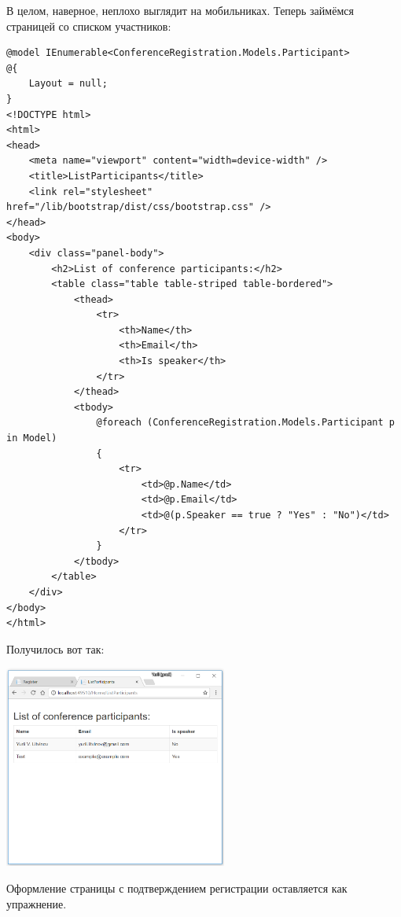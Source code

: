 \documentclass[a5paper]{article}
\begin{document}
В целом, наверное, неплохо выглядит на мобильниках. Теперь займёмся страницей со списком участников:

\begin{verbatim}
@model IEnumerable<ConferenceRegistration.Models.Participant>
@{
    Layout = null;
}
<!DOCTYPE html>
<html>
<head>
    <meta name="viewport" content="width=device-width" />
    <title>ListParticipants</title>
    <link rel="stylesheet" href="/lib/bootstrap/dist/css/bootstrap.css" />
</head>
<body>
    <div class="panel-body">
        <h2>List of conference participants:</h2>
        <table class="table table-striped table-bordered">
            <thead>
                <tr>
                    <th>Name</th>
                    <th>Email</th>
                    <th>Is speaker</th>
                </tr>
            </thead>
            <tbody>
                @foreach (ConferenceRegistration.Models.Participant p in Model)
                {
                    <tr>
                        <td>@p.Name</td>
                        <td>@p.Email</td>
                        <td>@(p.Speaker == true ? "Yes" : "No")</td>
                    </tr>
                }
            </tbody>
        </table>
    </div>
</body>
</html>
\end{verbatim}

Получилось вот так:

\begin{center}
	\includegraphics[width=0.55\textwidth]{styledListParticipants.png}
\end{center}

Оформление страницы с подтверждением регистрации оставляется как упражнение.
\end{document}
